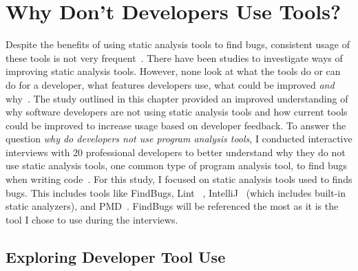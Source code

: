 \chapter{Why Don't Developers Use Tools?}
\label{chap:why}


Despite the benefits of using static analysis tools to find bugs, consistent
usage of these tools is not very frequent~\cite{Ayewah:2008:FindBugs, ge2012reconciling}. 
There have been studies to investigate ways of improving static analysis tools.
However, none look at what the tools do or can do for a developer, what features
developers use, what could be improved \emph{and}
why~\cite{Bessey:2010:Coverity, Khoo:2008:PathProjection}. The study outlined in this chapter provided an improved understanding 
of why software developers are not using static analysis tools and how
current tools could be improved to increase usage based on developer feedback.
To answer the question \emph{why do developers not use program analysis tools}, I conducted interactive interviews with 20 professional developers to better understand why they do not use static analysis tools, one common type of program analysis tool, to find bugs when writing code~\cite{johnson2013don}.
For this study, I focused on static analysis tools used to finds bugs.
This includes tools like FindBugs, Lint~\cite{Johnson:1978:Lint} ,
IntelliJ~\cite{IntelliJIDEA} (which includes built-in static analyzers), and
PMD~\cite{PMD}. FindBugs will be referenced the most as it is the tool I chose
to use during the interviews.

\section{Exploring Developer Tool Use}

